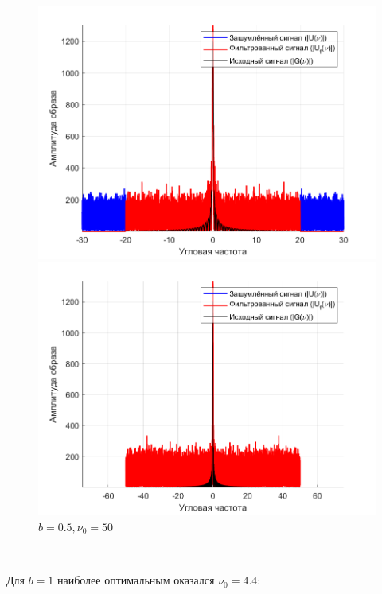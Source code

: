 \documentclass[a4paper]{article}
\begin{document}
\begin{figure}[H]
    \begin{minipage}{0.5\textwidth}
        \centering
        \includegraphics[width=\textwidth]{part1/0.5_20_Fourier.png}
        \caption{$b=0.5, \nu_0 = 20$}
    \end{minipage}    
    \begin{minipage}{0.5\textwidth}
        \centering
        \includegraphics[width=\textwidth]{part1/0.5_50_Fourier.png}
        \caption{$b=0.5, \nu_0 = 50$}
    \end{minipage}
\end{figure}\ 

Для $b = 1$ наиболее оптимальным оказался $\nu_0=4.4$:
\end{document}
